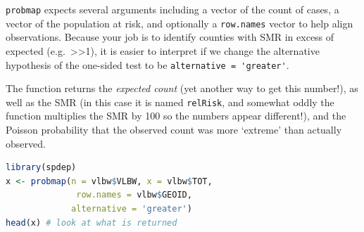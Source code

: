 \documentclass[
]{book}
\newcommand{\passthrough}[1]{#1}
\begin{document}
\passthrough{\lstinline!probmap!} expects several arguments including a vector of the count of cases, a vector of the population at risk, and optionally a \passthrough{\lstinline!row.names!} vector to help align observations. Because your job is to identify counties with SMR in excess of expected (e.g.~\textgreater\textgreater1), it is easier to interpret if we change the alternative hypothesis of the one-sided test to be \passthrough{\lstinline!alternative = 'greater'!}.

The function returns the \emph{expected count} (yet another way to get this number!), as well as the SMR (in this case it is named \passthrough{\lstinline!relRisk!}, and somewhat oddly the function multiplies the SMR by 100 so the numbers appear different!), and the Poisson probability that the observed count was more `extreme' than actually observed.

\begin{lstlisting}[language=R]
library(spdep)
x <- probmap(n = vlbw$VLBW, x = vlbw$TOT, 
              row.names = vlbw$GEOID,
             alternative = 'greater')
head(x) # look at what is returned
\end{lstlisting}

 
  \providecommand{\huxb}[2]{\arrayrulecolor[RGB]{#1}\global\arrayrulewidth=#2pt}
  \providecommand{\huxvb}[2]{\color[RGB]{#1}\vrule width #2pt}
  \providecommand{\huxtpad}[1]{\rule{0pt}{#1}}
  \providecommand{\huxbpad}[1]{\rule[-#1]{0pt}{#1}}
\end{document}
